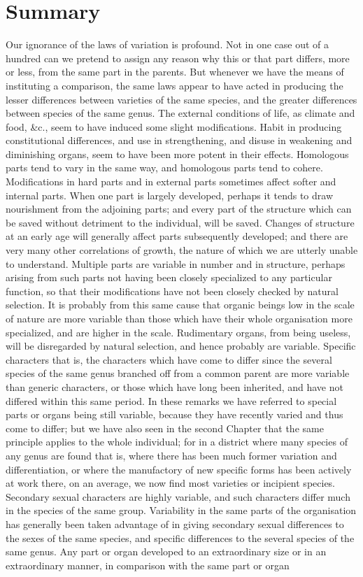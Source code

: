 \section{Summary}
\indent Our ignorance of the laws of variation is profound. Not in one case out of a hundred can we pretend to assign any reason why this or that part differs, more or less, from the same part in the parents. But whenever we have the means of instituting a comparison, the same laws appear to have acted in producing the lesser differences between varieties of the same species, and the greater differences between species of the same genus. The external conditions of life, as climate and food, \&c., seem to have induced some slight modifications. Habit in producing constitutional differences, and use in strengthening, and disuse in weakening and diminishing organs, seem to have been more potent in their effects. Homologous parts tend to vary in the same way, and homologous parts tend to cohere. Modifications in hard parts and in external parts sometimes affect softer and internal parts. When one part is largely developed, perhaps it tends to draw nourishment from the adjoining parts; and every part of the structure which can be saved without detriment to the individual, will be saved. Changes of structure at an early age will generally affect parts subsequently developed; and there are very many other correlations of growth, the nature of which we are utterly unable to understand. Multiple parts are variable in number and in structure, perhaps arising from such parts not having been closely specialized to any particular function, so that their modifications have not been closely checked by natural selection. It is probably from this same cause that organic beings low in the scale of nature are more variable than those which have their whole organisation more specialized, and are higher in the scale. Rudimentary organs, from being useless, will be disregarded by natural selection, and hence probably are variable. Specific characters that is, the characters which have come to differ since the several species of the same genus branched off from a common parent are more variable than generic characters, or those which have long been inherited, and have not differed within this same period. In these remarks we have referred to special parts or organs being still variable, because they have recently varied and thus come to differ; but we have also seen in the second Chapter that the same principle applies to the whole individual; for in a district where many species of any genus are found that is, where there has been much former variation and differentiation, or where the manufactory of new specific forms has been actively at work there, on an average, we now find most varieties or incipient species. Secondary sexual characters are highly variable, and such characters differ much in the species of the same group. Variability in the same parts of the organisation has generally been taken advantage of in giving secondary sexual differences to the sexes of the same species, and specific differences to the several species of the same genus. Any part or organ developed to an extraordinary size or in an extraordinary manner, in comparison with the same part or organ 